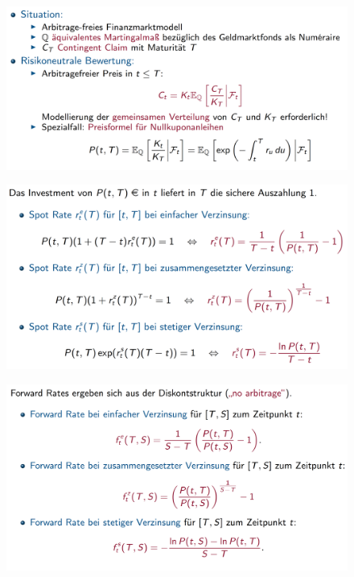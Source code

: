 \documentclass[12pt]{report}
\theoremstyle{dotless}
\theoremstyle{definition}
\begin{document}
\begin{figure}[H]
\centering
\includegraphics[width=\textwidth]{Bilder/RisikoneutraleBewertung.png}
\end{figure}

\begin{figure}[H]
\centering
\includegraphics[width=\textwidth]{Bilder/SpotRate.png}
\end{figure}

\begin{figure}[H]
\centering
\includegraphics[width=\textwidth]{Bilder/FwdRate.png}
\end{figure}
\end{document}
